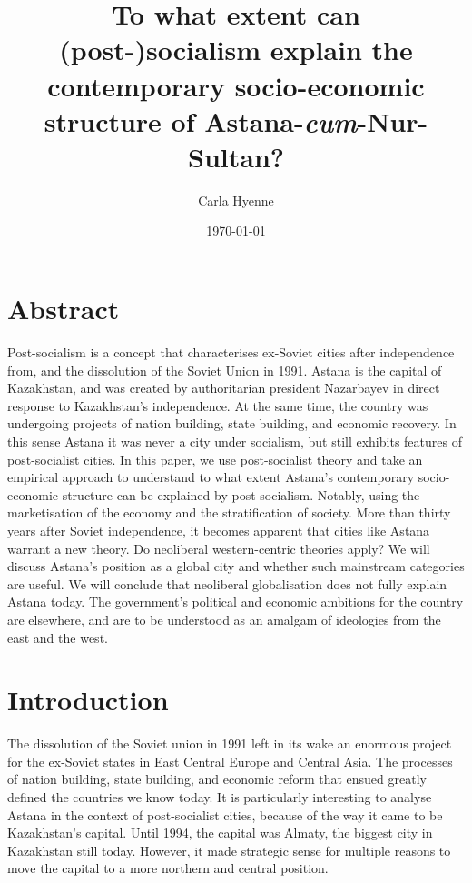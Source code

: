 \documentclass{article}
\title{To what extent can (post-)socialism explain the contemporary socio-economic structure of Astana-\textit{cum}-Nur-Sultan?}
\author{Carla Hyenne}
\date{\today}
\begin{document}
\maketitle 

\section{Abstract}

Post-socialism is a concept that characterises ex-Soviet cities after independence from, and the dissolution of the Soviet Union in 1991.
Astana is the capital of Kazakhstan, and was created by authoritarian president Nazarbayev in direct response to Kazakhstan's independence. At the same time, the country was undergoing projects of nation building, state building, and economic recovery. In this sense Astana it was never a city under socialism, but still exhibits features of post-socialist cities. In this paper, we use post-socialist theory and take an empirical approach to understand to what extent Astana's contemporary socio-economic structure can be explained by post-socialism. Notably, using the marketisation of the economy and the stratification of society. 
More than thirty years after Soviet independence, it becomes apparent that cities like Astana warrant a new theory. Do neoliberal western-centric theories apply? We will discuss Astana's position as a global city and whether such mainstream categories are useful. We will conclude that neoliberal globalisation does not fully explain Astana today. The government's political and economic ambitions for the country are elsewhere, and are to be understood as an amalgam of ideologies from the east and the west.

\section{Introduction}

The dissolution of the Soviet union in 1991 left in its wake an enormous project for the ex-Soviet states in East Central Europe and Central Asia. The processes of nation building, state building, and economic reform that ensued greatly defined the countries we know today. It is particularly interesting to analyse Astana in the context of post-socialist cities, because of the way it came to be Kazakhstan's capital. 
Until 1994, the capital was Almaty, the biggest city in Kazakhstan still today. However, it made strategic sense for multiple reasons to move the capital to a more northern and central position. 
\end{document}
